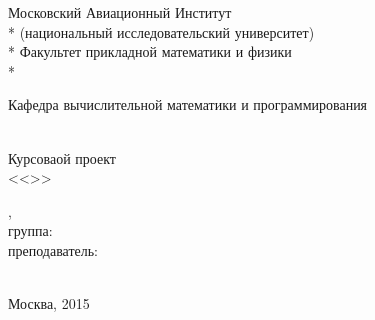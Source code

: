 \documentclass[a4paper, 12pt]{report}
\begin{document}
\begin{titlepage}

\newpage

\begin{center}
Московский Авиационный Институт \\*
(национальный исследовательский университет) \\*
Факультет прикладной математики и физики \\*
\hrulefill
\end{center}

\begin{center}
Кафедра вычислительной математики и программирования
\end{center}

\vspace{6em}

\begin{center}
\Large \CourseName \\
	Курсоваой проект \\
  <<\Subject>>
\end{center}

\vspace{2em}
\vspace{6em}

\begin{flushright}
	\StudentName, \\
	группа: \Group \\
\vspace{1em}
преподаватель:\\
   \PrepName \\
\end{flushright}

\vspace{\fill}

\begin{center}
Москва, 2015
\end{center}

\end{titlepage}
\end{document}
